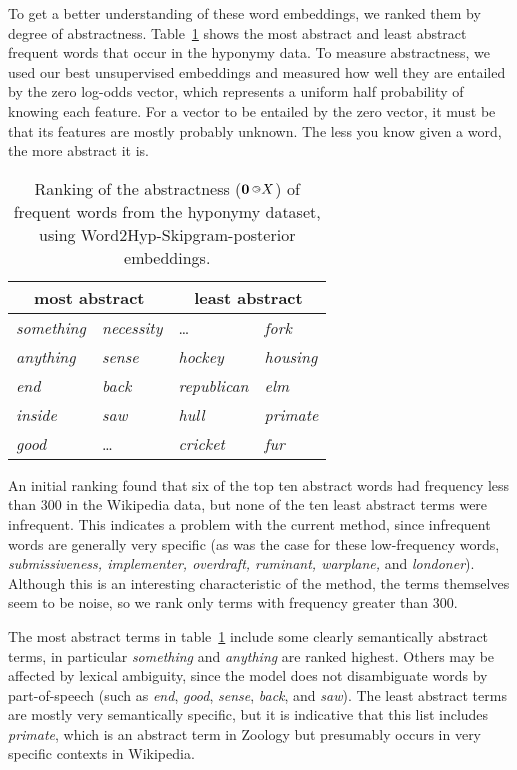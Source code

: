 \documentclass[11pt,a4paper]{article}
\newcommand{\bie}{{\raisebox{1.8pt}{\makebox[0pt][l]{\hspace{1.3pt}${\scriptscriptstyle >}$}${\scriptscriptstyle \bigcirc}$}}}
\begin{document}
To get a better understanding of these word embeddings, we ranked them by
degree of abstractness.
Table~\ref{tab:abstract} shows the most abstract and least abstract frequent
words that occur in the hyponymy data.  To measure abstractness, we used our
best unsupervised embeddings and measured how well they are entailed by the
zero log-odds vector, which represents a uniform half probability of knowing
each feature.  For a vector to be entailed by the zero vector, it must be
that its features are mostly probably unknown.  The less you know given a
word, the more abstract it is.


\begin{table}[tb]
\begin{center}
\begin{tabular}{|ll|ll|}
\hline
\multicolumn{2}{|c|}{most abstract} & \multicolumn{2}{c|}{least abstract} \\
\hline
{\em something} & {\em necessity}	& { \dots} & {\em fork}   \\[-0.3ex]
{\em anything} & {\em sense}  	& {\em hockey} & {\em housing}  \\[-0.3ex]
{\em end} & {\em back}     	& {\em republican} & {\em elm}  \\[-0.3ex]
{\em inside} & {\em saw}    	& {\em hull} & {\em primate}  \\[-0.3ex]
{\em good} & { \dots}      	& {\em cricket} & {\em fur}  \\
\hline
\end{tabular}
\end{center}
\caption{ Ranking of the abstractness (${\bf 0}\,\bie X$) of frequent words from the
  hyponymy dataset, using Word2Hyp-Skipgram-posterior embeddings.  
}
\label{tab:abstract}
\end{table}



An initial ranking found that six of the top ten abstract words had frequency
less than 300 in the Wikipedia data, but none of the ten least abstract terms
were infrequent.  This indicates a problem with the current method, since
infrequent words are generally very specific (as was the case for
these low-frequency words, {\em submissiveness, implementer, overdraft,
  ruminant, warplane,} and {\em londoner}).  Although this is an interesting
characteristic of the method, the terms themselves seem to be noise, so we
rank only terms with frequency greater than 300.

The most abstract terms in table~\ref{tab:abstract} include some clearly
semantically abstract terms, in particular {\em something} and {\em anything}
are ranked highest.
Others may be affected by lexical ambiguity, since the model does not
disambiguate words by part-of-speech (such as {\em end}, {\em good}, {\em
  sense}, {\em back}, and {\em saw}).  The least abstract terms are mostly very
semantically specific, but it is indicative that this list includes {\em
  primate}, which is an abstract term in Zoology but presumably occurs in very
specific contexts in Wikipedia.
\end{document}
